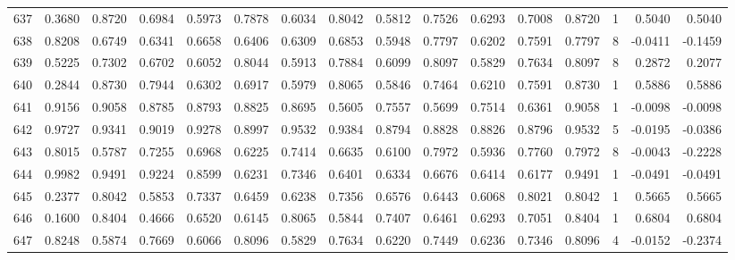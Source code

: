 \begin{tabular}{lrrrrrrrrrrrrrrr}
637 &      0.3680 &  0.8720 &  0.6984 &  0.5973 &  0.7878 &  0.6034 &  0.8042 &  0.5812 &  0.7526 &  0.6293 &   0.7008 &     0.8720 &      1 &                    0.5040 &                     0.5040 \\
638 &      0.8208 &  0.6749 &  0.6341 &  0.6658 &  0.6406 &  0.6309 &  0.6853 &  0.5948 &  0.7797 &  0.6202 &   0.7591 &     0.7797 &      8 &                   -0.0411 &                    -0.1459 \\
639 &      0.5225 &  0.7302 &  0.6702 &  0.6052 &  0.8044 &  0.5913 &  0.7884 &  0.6099 &  0.8097 &  0.5829 &   0.7634 &     0.8097 &      8 &                    0.2872 &                     0.2077 \\
640 &      0.2844 &  0.8730 &  0.7944 &  0.6302 &  0.6917 &  0.5979 &  0.8065 &  0.5846 &  0.7464 &  0.6210 &   0.7591 &     0.8730 &      1 &                    0.5886 &                     0.5886 \\
641 &      0.9156 &  0.9058 &  0.8785 &  0.8793 &  0.8825 &  0.8695 &  0.5605 &  0.7557 &  0.5699 &  0.7514 &   0.6361 &     0.9058 &      1 &                   -0.0098 &                    -0.0098 \\
642 &      0.9727 &  0.9341 &  0.9019 &  0.9278 &  0.8997 &  0.9532 &  0.9384 &  0.8794 &  0.8828 &  0.8826 &   0.8796 &     0.9532 &      5 &                   -0.0195 &                    -0.0386 \\
643 &      0.8015 &  0.5787 &  0.7255 &  0.6968 &  0.6225 &  0.7414 &  0.6635 &  0.6100 &  0.7972 &  0.5936 &   0.7760 &     0.7972 &      8 &                   -0.0043 &                    -0.2228 \\
644 &      0.9982 &  0.9491 &  0.9224 &  0.8599 &  0.6231 &  0.7346 &  0.6401 &  0.6334 &  0.6676 &  0.6414 &   0.6177 &     0.9491 &      1 &                   -0.0491 &                    -0.0491 \\
645 &      0.2377 &  0.8042 &  0.5853 &  0.7337 &  0.6459 &  0.6238 &  0.7356 &  0.6576 &  0.6443 &  0.6068 &   0.8021 &     0.8042 &      1 &                    0.5665 &                     0.5665 \\
646 &      0.1600 &  0.8404 &  0.4666 &  0.6520 &  0.6145 &  0.8065 &  0.5844 &  0.7407 &  0.6461 &  0.6293 &   0.7051 &     0.8404 &      1 &                    0.6804 &                     0.6804 \\
647 &      0.8248 &  0.5874 &  0.7669 &  0.6066 &  0.8096 &  0.5829 &  0.7634 &  0.6220 &  0.7449 &  0.6236 &   0.7346 &     0.8096 &      4 &                   -0.0152 &                    -0.2374 \\

\end{tabular}
